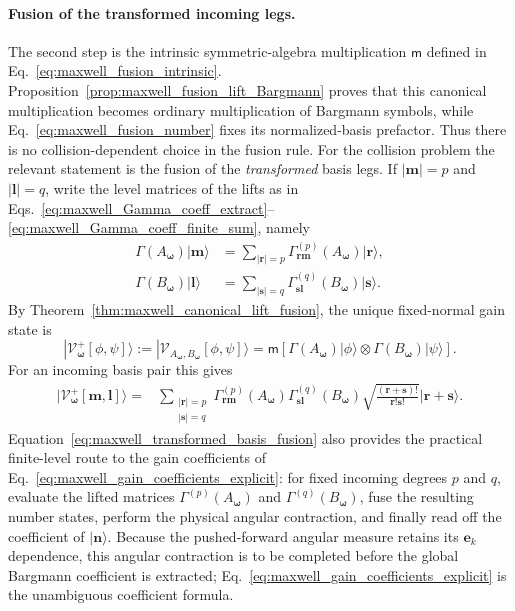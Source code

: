\documentclass[11pt,oneside]{article}
\numberwithin{equation}{section}
\theoremstyle{definition}
\begin{document}
\paragraph{Fusion of the transformed incoming legs.}
The second step is the intrinsic symmetric-algebra multiplication $\mathsf m$ defined in Eq.~\eqref{eq:maxwell_fusion_intrinsic}.  Proposition~\ref{prop:maxwell_fusion_lift_Bargmann} proves that this canonical multiplication becomes ordinary multiplication of Bargmann symbols, while Eq.~\eqref{eq:maxwell_fusion_number} fixes its normalized-basis prefactor.  Thus there is no collision-dependent choice in the fusion rule.  For the collision problem the relevant statement is the fusion of the \emph{transformed} basis legs.  If $|\bm m|=p$ and $|\bm l|=q$, write the level matrices of the lifts as in Eqs.~\eqref{eq:maxwell_Gamma_coeff_extract}--\eqref{eq:maxwell_Gamma_coeff_finite_sum}, namely
\begin{align}
\Gamma(A_{\bm\omega})|\bm m\rangle
&=
\sum_{|\bm r|=p}
\Gamma^{(p)}_{\bm r\bm m}(A_{\bm\omega})|\bm r\rangle,
\\
\Gamma(B_{\bm\omega})|\bm l\rangle
&=
\sum_{|\bm s|=q}
\Gamma^{(q)}_{\bm s\bm l}(B_{\bm\omega})|\bm s\rangle.
\end{align}
By Theorem~\ref{thm:maxwell_canonical_lift_fusion}, the unique fixed-normal gain state is
\begin{equation}
|\mathcal V_{\bm\omega}^{+}[\phi,\psi]\rangle
:=
|\mathcal V_{A_{\bm\omega},B_{\bm\omega}}[\phi,\psi]\rangle
=
\mathsf m\!\left[
\Gamma(A_{\bm\omega})|\phi\rangle
\otimes
\Gamma(B_{\bm\omega})|\psi\rangle
\right].
\label{eq:maxwell_fixed_normal_vertex}
\end{equation}
For an incoming basis pair this gives
\begin{equation}
\begin{aligned}
|\mathcal V_{\bm\omega}^{+}[\bm m,\bm l]\rangle
={}&
\sum_{\substack{|\bm r|=p\\|\bm s|=q}}
\Gamma^{(p)}_{\bm r\bm m}(A_{\bm\omega})
\Gamma^{(q)}_{\bm s\bm l}(B_{\bm\omega})
\sqrt{\frac{(\bm r+\bm s)!}{\bm r!\bm s!}}
|\bm r+\bm s\rangle .
\end{aligned}
\label{eq:maxwell_transformed_basis_fusion}
\end{equation}
Equation~\eqref{eq:maxwell_transformed_basis_fusion} also provides the practical finite-level route to the gain coefficients of Eq.~\eqref{eq:maxwell_gain_coefficients_explicit}: for fixed incoming degrees $p$ and $q$, evaluate the lifted matrices $\Gamma^{(p)}(A_{\bm\omega})$ and $\Gamma^{(q)}(B_{\bm\omega})$, fuse the resulting number states, perform the physical angular contraction, and finally read off the coefficient of $|\bm n\rangle$.  Because the pushed-forward angular measure retains its $\bm e_k$ dependence, this angular contraction is to be completed before the global Bargmann coefficient is extracted; Eq.~\eqref{eq:maxwell_gain_coefficients_explicit} is the unambiguous coefficient formula.
\end{document}
